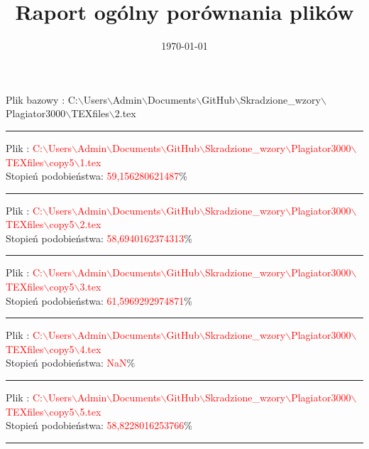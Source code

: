 \documentclass{article}
\begin{document}
\title{\huge\bfseries Raport ogólny porównania plików }
\date{\today}
\maketitle
\begin{flushleft}
Plik bazowy : C:$\backslash$Users$\backslash$Admin$\backslash$Documents$\backslash$GitHub$\backslash$Skradzione\_wzory$\backslash$Plagiator3000$\backslash$TEXfiles$\backslash$2.tex
\end{flushleft}
\hrule
\begin{flushleft}
Plik : \textcolor{Red}{C:$\backslash$Users$\backslash$Admin$\backslash$Documents$\backslash$GitHub$\backslash$Skradzione\_wzory$\backslash$Plagiator3000$\backslash$TEXfiles$\backslash$copy5$\backslash$1.tex}\\
{\huge Stopień podobieństwa: \textcolor{Red}{59,156280621487}\%} \\ 

\end{flushleft}
\hrule
\begin{flushleft}
Plik : \textcolor{Red}{C:$\backslash$Users$\backslash$Admin$\backslash$Documents$\backslash$GitHub$\backslash$Skradzione\_wzory$\backslash$Plagiator3000$\backslash$TEXfiles$\backslash$copy5$\backslash$2.tex}\\
{\huge Stopień podobieństwa: \textcolor{Red}{58,6940162374313}\%} \\ 

\end{flushleft}
\hrule
\begin{flushleft}
Plik : \textcolor{Red}{C:$\backslash$Users$\backslash$Admin$\backslash$Documents$\backslash$GitHub$\backslash$Skradzione\_wzory$\backslash$Plagiator3000$\backslash$TEXfiles$\backslash$copy5$\backslash$3.tex}\\
{\huge Stopień podobieństwa: \textcolor{Red}{61,5969292974871}\%} \\ 

\end{flushleft}
\hrule
\begin{flushleft}
Plik : \textcolor{Red}{C:$\backslash$Users$\backslash$Admin$\backslash$Documents$\backslash$GitHub$\backslash$Skradzione\_wzory$\backslash$Plagiator3000$\backslash$TEXfiles$\backslash$copy5$\backslash$4.tex}\\
{\huge Stopień podobieństwa: \textcolor{Red}{NaN}\%} \\ 

\end{flushleft}
\hrule
\begin{flushleft}
Plik : \textcolor{Red}{C:$\backslash$Users$\backslash$Admin$\backslash$Documents$\backslash$GitHub$\backslash$Skradzione\_wzory$\backslash$Plagiator3000$\backslash$TEXfiles$\backslash$copy5$\backslash$5.tex}\\
{\huge Stopień podobieństwa: \textcolor{Red}{58,8228016253766}\%} \\ 

\end{flushleft}
\hrule
\end{document}
